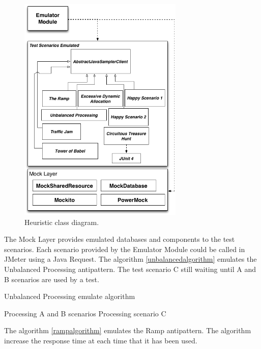 \begin{figure}[h]
\centering
\includegraphics[width=0.7\textwidth]{./images/emulator.png}
\caption{Heuristic class diagram.}
\label{fig:emulator}
\end{figure}  

The Mock Layer provides emulated databases and components to the test scenarios. Each scenario provided by the Emulator Module could be called in JMeter using a Java Request. The algorithm \ref{unbalancedalgorithm} emulates the Unbalanced Processing antipattern. The test scenario C still waiting until A and B scenarios are used by a test.

\begin{algorithm}[H]
  \caption{Unbalanced Processing emulate algorithm}\label{unbalancedalgorithm}
  \begin{algorithmic}[1]
    
    \State Processing A and B scenarios
    \EndWhile
    \State Processing scenario C
      
  \end{algorithmic}
\end{algorithm}

The algorithm \ref{rampalgorithm} emulates  the Ramp antipattern. The algorithm increase the response time at each  time that it has been used.

